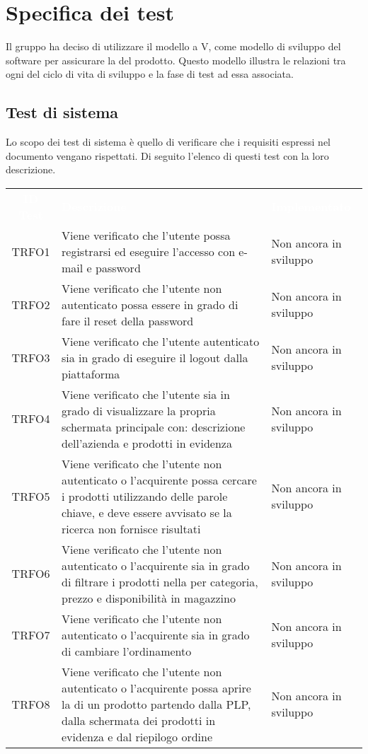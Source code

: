 \section{Specifica dei test}
\label{specificatest}
Il gruppo ha deciso di utilizzare il modello a V, come modello di sviluppo del software per assicurare la  del prodotto. Questo modello illustra le relazioni tra ogni  del ciclo di vita di sviluppo e la fase di test ad essa associata.
\subsection{Test di sistema}
Lo scopo dei test di sistema è quello di verificare che i requisiti espressi nel documento \AdR{} vengano rispettati. Di seguito l'elenco di questi test con la loro descrizione.
\begin{longtable}{|c| C{10cm} |C{3cm}|}
	\textcolor{white}{\textbf{ID Test}}&
	\textcolor{white}{\textbf{Descrizione}}&
	\textcolor{white}{\textbf{Implementato}}\label{tab:TestSistema1}\\
	TRFO1 & Viene verificato che l'utente possa registrarsi ed eseguire l'accesso con e-mail e password & Non ancora in sviluppo\\ \hline
	TRFO2 & Viene verificato che l'utente non autenticato possa essere in grado di fare il reset della password & Non ancora in sviluppo\\ \hline
	TRFO3 & Viene verificato che l'utente autenticato sia in grado di eseguire il logout dalla piattaforma & Non ancora in sviluppo\\ \hline
	TRFO4 & Viene verificato che l'utente sia in grado di visualizzare la propria schermata principale con: descrizione dell'azienda e prodotti in evidenza & Non ancora in sviluppo\\ \hline
	TRFO5 & Viene verificato che l'utente non autenticato o l'acquirente possa cercare i prodotti utilizzando delle parole chiave, e deve essere avvisato se la ricerca non fornisce risultati & Non ancora in sviluppo\\ \hline
	TRFO6 & Viene verificato che l'utente non autenticato o l'acquirente sia in grado di filtrare i prodotti nella  per categoria, prezzo e disponibilità in magazzino & Non ancora in sviluppo\\ \hline
	TRFO7 & Viene verificato che l'utente non autenticato o l'acquirente sia in grado di cambiare l'ordinamento & Non ancora in sviluppo\\ \hline
	TRFO8 & Viene verificato che l'utente non autenticato o l'acquirente possa aprire la  di un prodotto partendo dalla PLP, dalla schermata dei prodotti in evidenza e dal riepilogo ordine & Non ancora in sviluppo\\ \hline

\end{longtable}
